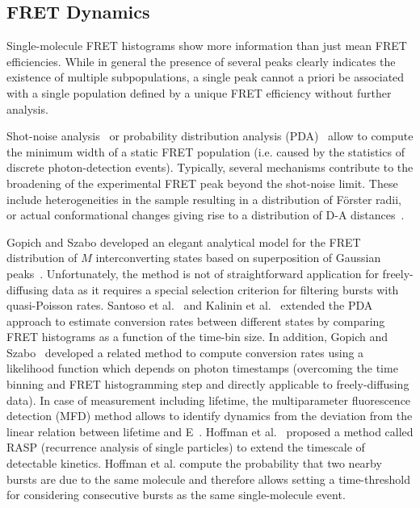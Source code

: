 \subsection{FRET Dynamics}
\label{sec:dynamics}

Single-molecule FRET histograms show more information than just mean FRET efficiencies.
While in general the presence of several peaks clearly indicates the existence of
multiple subpopulations, a single peak cannot a priori be associated with
a single population defined by a unique FRET efficiency without further analysis.

Shot-noise analysis~\cite{Nir_2006} or probability
distribution analysis (PDA)~\cite{Antonik2006,kalinin_probability_2007}
allow to compute the minimum width of a static FRET population
(i.e. caused by the statistics of discrete photon-detection events).
Typically, several mechanisms
contribute to the broadening of the experimental FRET peak
beyond the shot-noise limit. These include heterogeneities in the sample
resulting in a distribution of Förster radii,
or actual conformational changes giving rise to a distribution
of D-A distances~\cite{sisamakis_accurate_2010}.

Gopich and Szabo developed an elegant analytical model 
for the FRET distribution of $M$ interconverting states  
based on superposition of Gaussian peaks~\cite{gopich_fret_2010}.
Unfortunately, the method is not of straightforward application for 
freely-diffusing data as it requires a special selection 
criterion for filtering bursts with quasi-Poisson rates.
Santoso et al.~\cite{santoso_probing_2009} and Kalinin et al.~\cite{Kalinin2010}
extended the PDA approach to estimate conversion rates between different
states by comparing FRET histograms as a function of the time-bin size.
In addition, Gopich and Szabo~\cite{Gopich2009, gopich_theory_2011} developed
a related method to compute conversion rates using
a likelihood function which depends on photon timestamps (overcoming
the time binning and FRET histogramming step and directly applicable 
to freely-diffusing data).
In case of measurement including lifetime, the multiparameter fluorescence
detection (MFD) method allows to identify dynamics from the deviation 
from the linear relation between lifetime and E~\cite{sisamakis_accurate_2010}.
Hoffman et al.~\cite{hoffmann_quantifying_2011} proposed a method 
called RASP (recurrence analysis of single particles) to extend 
the timescale of detectable kinetics.
Hoffman et al. compute the probability that two nearby bursts are due to
the same molecule and therefore allows setting a time-threshold
for considering consecutive bursts as the same single-molecule event.

